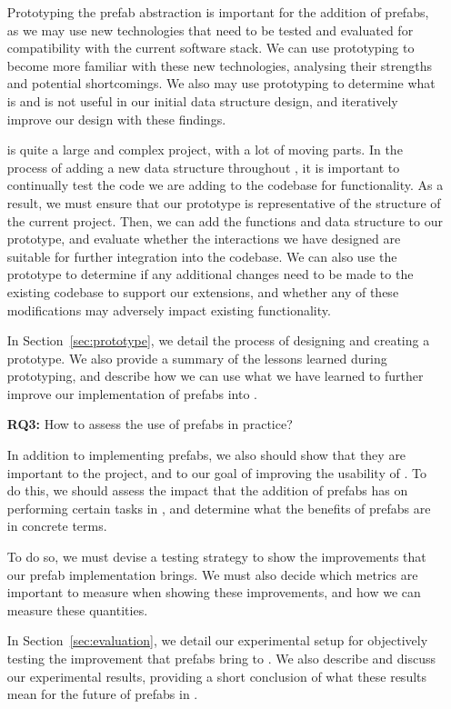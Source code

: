 \documentclass[11pt]{article}
\begin{document}
\begin{itemize}
			Prototyping the prefab abstraction is important for the addition of prefabs, as we may use new technologies that need to be tested and evaluated for compatibility with the current \opendc{} software stack.
			We can use prototyping to become more familiar with these new technologies, analysing their strengths and potential shortcomings.
			We also may use prototyping to determine what is and is not useful in our initial data structure design, and iteratively improve our design with these findings.

			\opendc{} is quite a large and complex project, with a lot of moving parts.
			In the process of adding a new data structure throughout \opendc{}, it is important to continually test the code we are adding to the codebase for functionality.
			As a result, we must ensure that our prototype is representative of the structure of the current \opendc{} project.
			Then, we can add the functions and data structure to our prototype, and evaluate whether the interactions we have designed are suitable for further integration into the \opendc{} codebase.
			We can also use the prototype to determine if any additional changes need to be made to the existing codebase to support our extensions, and whether any of these modifications may adversely impact existing functionality.

			In Section~\ref{sec:prototype}, we detail the process of designing and creating a prototype.
			We also provide a summary of the lessons learned during prototyping, and describe how we can use what we have learned to further improve our implementation of prefabs into \opendc{}.
			\item [\textbf{RQ3:}] How to assess the use of prefabs in practice?

			In addition to implementing prefabs, we also should show that they are important to the \opendc{} project, and to our goal of improving the usability of \opendc{}.
			To do this, we should assess the impact that the addition of prefabs has on performing certain tasks in \opendc{}, and determine what the benefits of prefabs are in concrete terms.

			To do so, we must devise a testing strategy to show the improvements that our prefab implementation brings.
			We must also decide which metrics are important to measure when showing these improvements, and how we can measure these quantities.

			In Section~\ref{sec:evaluation}, we detail our experimental setup for objectively testing the improvement that prefabs bring to \opendc{}.
			We also describe and discuss our experimental results, providing a short conclusion of what these results mean for the future of prefabs in \opendc{}.
			
		\end{itemize}
	
\end{document}
